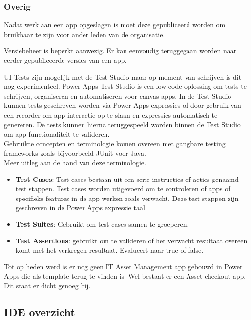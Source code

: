 \subsubsection{Overig}
\label{subsec:overig}

Nadat werk aan een app opgeslagen is moet deze gepubliceerd worden om bruikbaar te zijn voor ander leden van de organisatie.

Versiebeheer is beperkt aanwezig. Er kan eenvoudig teruggegaan worden naar eerder gepubliceerde versies van een app.

UI Tests zijn mogelijk met de Test Studio maar op moment van schrijven is dit nog experimenteel. Power Apps Test Studio is een low-code oplossing om tests te schrijven, organiseren en automatiseren voor canvas apps. In de Test Studio kunnen tests geschreven worden via Power Apps expressies of door gebruik van een recorder om app interactie op te slaan en expressies automatisch te genereren. De tests kunnen hierna teruggespeeld worden binnen de Test Studio om app functionaliteit te valideren. \\ 
Gebruikte concepten en terminologie komen overeen met gangbare testing frameworks zoals bijvoorbeeld JUnit voor Java. \\
Meer uitleg aan de hand van deze terminologie. 
\begin{itemize}
    \item \textbf{Test Cases}: Test cases bestaan uit een serie instructies of acties genaamd test stappen. Test cases worden utigevoerd om te controleren of apps of specifieke features in de app werken zoals verwacht. Deze test stappen zijn geschreven in de Power Apps expressie taal.
    \item \textbf{Test Suites}: Gebruikt om test cases samen te groeperen.
    \item \textbf{Test Assertions}: gebruikt om te valideren of het verwacht resultaat overeen komt met het verkregen resultaat. Evalueert naar true of false.
\end{itemize}
\autocite{MicrosoftDocs2019d}

Tot op heden werd is er nog geen IT Asset Management app gebouwd in Power Apps die als template terug te vinden is. Wel bestaat er een Asset checkout app. Dit staat er dicht genoeg bij. \autocite{Meganathan2019}

\subsection{IDE overzicht}

